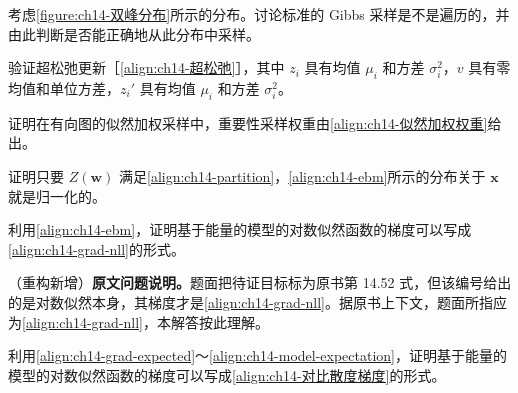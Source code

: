 \documentclass[../../main.tex]{subfiles}
\begin{document}
\begin{exercise}[$\star$]\label{exercise:ch14-13}
考虑\cref{figure:ch14-双峰分布}所示的分布。讨论标准的 Gibbs 采样是不是遍历的，并由此判断是否能正确地从此分布中采样。
\end{exercise}

\begin{exercise}[$\star$]\label{exercise:ch14-14}
验证超松弛更新［\eqref{align:ch14-超松弛}］，其中 $z_{i}$ 具有均值 $\mu_{i}$ 和方差 $\sigma_{i}^{2}$，$v$ 具有零均值和单位方差，$z_{i}'$ 具有均值 $\mu_{i}$ 和方差 $\sigma_{i}^{2}$。
\end{exercise}

\begin{exercise}[$\star$]\label{exercise:ch14-15}
证明在有向图的似然加权采样中，重要性采样权重由\eqref{align:ch14-似然加权权重}给出。
\end{exercise}

\begin{exercise}[$\star$]\label{exercise:ch14-16}
证明只要 $Z(\bm{w})$ 满足\eqref{align:ch14-partition}，\eqref{align:ch14-ebm}所示的分布关于 $\bm{x}$ 就是归一化的。
\end{exercise}

\begin{exercise}[$\star\star$]\label{exercise:ch14-17}
利用\eqref{align:ch14-ebm}，证明基于能量的模型的对数似然函数的梯度可以写成\eqref{align:ch14-grad-nll}的形式。
\end{exercise}

\begin{remark}（重构新增）\textbf{原文问题说明。}题面把待证目标标为原书第 14.52 式，但该编号给出的是对数似然本身，其梯度才是\eqref{align:ch14-grad-nll}。据原书上下文，题面所指应为\eqref{align:ch14-grad-nll}，本解答按此理解。
\end{remark}

\begin{exercise}[$\star\star$]\label{exercise:ch14-18}
利用\eqref{align:ch14-grad-expected}～\eqref{align:ch14-model-expectation}，证明基于能量的模型的对数似然函数的梯度可以写成\eqref{align:ch14-对比散度梯度}的形式。
\end{exercise}
\end{document}
